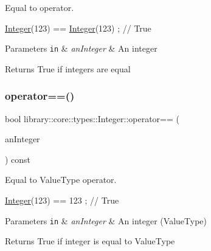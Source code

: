 Equal to operator. 


\begin{DoxyCode}
\hyperlink{classlibrary_1_1core_1_1types_1_1_integer_a6483b1c4e13e5ed6af5e7a58347efead}{Integer}(123) == \hyperlink{classlibrary_1_1core_1_1types_1_1_integer_a6483b1c4e13e5ed6af5e7a58347efead}{Integer}(123) ; \textcolor{comment}{// True}
\end{DoxyCode}



\begin{DoxyParams}[1]{Parameters}
\mbox{\tt in}  & {\em an\+Integer} & An integer \\
\hline
\end{DoxyParams}
\begin{DoxyReturn}{Returns}
True if integers are equal 
\end{DoxyReturn}
\mbox{\label{classlibrary_1_1core_1_1types_1_1_integer_a02858e726140a9e84281699a41675081}} 
\subsubsection{\texorpdfstring{operator==()}{operator==()}\hspace{0.1cm}{\footnotesize\ttfamily [2/2]}}
{\footnotesize\ttfamily bool library\+::core\+::types\+::\+Integer\+::operator== (\begin{DoxyParamCaption}\item[{const \hyperlink{classlibrary_1_1core_1_1types_1_1_integer_a623afb1580f870fd8a1997b1c12c917d}{Integer\+::\+Value\+Type} \&}]{an\+Integer }\end{DoxyParamCaption}) const}



Equal to Value\+Type operator. 


\begin{DoxyCode}
\hyperlink{classlibrary_1_1core_1_1types_1_1_integer_a6483b1c4e13e5ed6af5e7a58347efead}{Integer}(123) == 123 ; \textcolor{comment}{// True}
\end{DoxyCode}



\begin{DoxyParams}[1]{Parameters}
\mbox{\tt in}  & {\em an\+Integer} & An integer (Value\+Type) \\
\hline
\end{DoxyParams}
\begin{DoxyReturn}{Returns}
True if integer is equal to Value\+Type 
\end{DoxyReturn}
\mbox{\label{classlibrary_1_1core_1_1types_1_1_integer_aa5e59aba88550137a1b120e90ab155fa}} 
